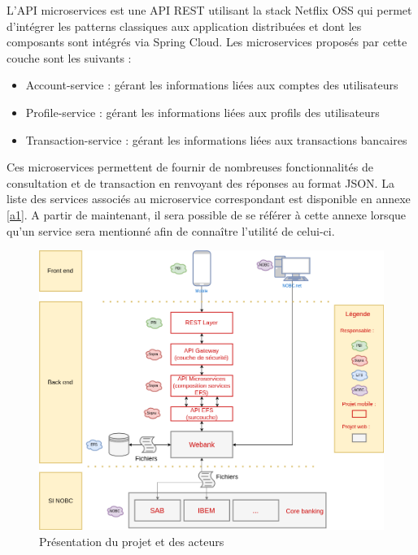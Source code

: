 	L'API microservices est une API REST utilisant la stack Netflix OSS qui permet d'intégrer les patterns classiques aux application distribuées et dont les composants sont intégrés via Spring Cloud. Les microservices proposés par cette couche sont les suivants :\\

\begin{itemize}
			\item Account-service : gérant les informations liées aux comptes des utilisateurs
			\item Profile-service : gérant les informations liées aux profils des utilisateurs
			\item Transaction-service : gérant les informations liées aux transactions bancaires \\
\end{itemize}

	Ces microservices permettent de fournir de nombreuses fonctionnalités de consultation et de transaction en renvoyant des réponses au format JSON. La liste des services associés au microservice correspondant est disponible en annexe \ref{a1}. A partir de maintenant, il sera possible de se référer à cette annexe lorsque qu'un service sera mentionné afin de connaître l'utilité de celui-ci.
	
\begin{figure}[H]
\raggedleft
	\includegraphics[scale=0.45]{images/travailNeuflizeOBC/architecture/archiFonc.png}
	\centering
	\caption{Présentation du projet et des acteurs}
	\label{archiFonc}
\end{figure}